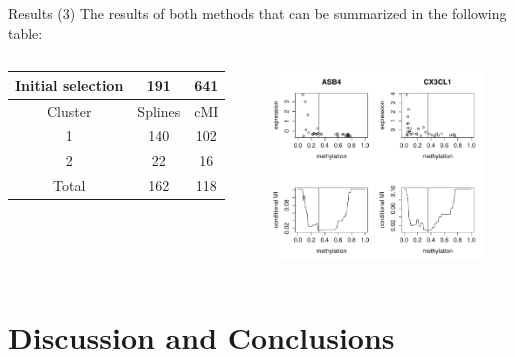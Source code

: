 \documentclass[handout]{beamer}
\begin{document}
\begin{frame}{Results (3)}
The results of both methods that can be summarized in the following table:
\begin{columns}
\begin{column}{.5\linewidth}
\begin{center}
\begin{tabular}{|c|c|c|}
\hline
Initial selection & 191 & 641 \\
\hline
\hline
Cluster & Splines & cMI \\
\hline
1 & 140 & 102 \\
2 & 22 & 16 \\
\hline
Total & 162 & 118 \\
\hline
\end{tabular}
\end{center}
\end{column}
\begin{column}{.5\linewidth}
\begin{center}
\includegraphics[height=5cm]{./images/grafic_two_genes.pdf}
\end{center}
\end{column}
\end{columns}
\end{frame}



\section{Discussion and Conclusions}
\end{document}
